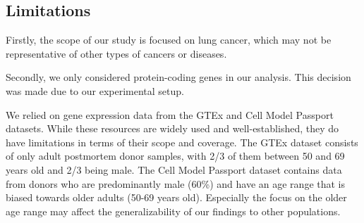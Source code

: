 \subsection{Limitations} \label{subsec:limitations}

Firstly, the scope of our study is focused on lung cancer, which may not be representative of other types of cancers or diseases.

Secondly, we only considered protein-coding genes in our analysis.
This decision was made due to our experimental setup.

We relied on gene expression data from the GTEx and Cell Model Passport datasets.
While these resources are widely used and well-established, they do have limitations in terms of their scope and coverage.
The GTEx dataset consists of only adult postmortem donor samples, with 2/3 of them between 50 and 69 years old and 2/3 being male.
The Cell Model Passport dataset contains data from donors who are predominantly male (60\%)
and have an age range that is biased towards older adults (50-69 years old).
Especially the focus on the older age range may affect the generalizability of our findings to other populations.\\
